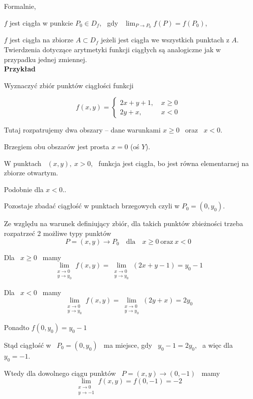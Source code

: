 Formalnie,

$f$ jest ciągła w punkcie $ P_0 \in D_f $, \ gdy \ $ \lim_{P \to P_0} f(P) = f(P_0) $,

$f$ jest ciągła na zbiorze $ A \subset D_f $ jeżeli jest ciągła we wszystkich punktach z $A$. \\

Twierdzenia dotyczące arytmetyki funkcji ciągłych są analogiczne jak w przypadku jednej zmiennej. \\

\textbf{Przykład}

Wyznaczyć zbiór punktów ciągłości funkcji

$$ f(x,y) = \left\{ \begin{aligned} 2x + y + 1, & \ x \geq 0 \\ 2y + x, & \ x < 0 \end{aligned} \right. $$

Tutaj rozpatrujemy dwa obszary -- dane warunkami $ x \geq 0 $ \ oraz \ $x < 0$.

Brzegiem obu obszarów jest prosta $ x = 0 $ (oś $Y$).

W punktach \ $ (x,y), \ x > 0 $, \ funkcja jest ciągła, bo jest równa elementarnej na zbiorze otwartym.

Podobnie dla $ x < 0 $..

Pozostaje zbadać ciągłość w punktach brzegowych czyli w $ P_0  = (0, y_0) $.

Ze względu na warunek definiujący zbiór, dla takich punktów zbieżności trzeba rozpatrzeć 2 możliwe typy punktów
$$ P = (x,y) \to P_0 \quad \textrm{dla} \quad x \geq 0 \ \textrm{oraz} \ x < 0 $$

Dla \ $ x \geq 0 $ \ mamy
$$ \lim_{\substack{x \to 0 \\ y \to y_0}} f(x,y) = \lim_{\substack{x \to 0 \\ y \to y_0}} (2x + y - 1) = y_0 - 1 $$

Dla \ $ x < 0 $ \ mamy
$$ \lim_{\substack{x \to 0 \\ y \to y_0}} f(x,y) = \lim_{\substack{x \to 0 \\ y \to y_0}} (2y + x) = 2y_0 $$

Ponadto $ f(0,y_0) = y_0 - 1 $

Stąd ciągłość w \ $ P_0 = (0,y_0) $ \ ma miejsce, gdy \ $ y_0 - 1 = 2y_0 $, \ a więc dla \ $ y_0 = -1$.

Wtedy dla dowolnego ciągu punktów \ $ P = (x,y) \to (0, -1) $ \ mamy
$$ \lim_{\substack{x \to 0 \\ y \to -1}} f(x,y) = f(0,-1) = -2 $$

